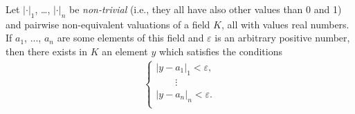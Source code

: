 \documentclass[12pt]{article}
\begin{document}
Let $|\cdot|_1$, \ldots, $|\cdot|_n$ be {\em non-trivial} (i.e., they all have also other values than 0 and 1) and pairwise non-equivalent valuations of a field $K$, all with values real numbers. \,If $a_1$, ..., $a_n$ are some elements of this field and $\varepsilon$ is an arbitrary positive number, then there exists in $K$ an element $y$ which satisfies the conditions
\begin{align*}
\begin{cases}
                |y-a_1|_1 < \varepsilon,\\
                \qquad     \vdots \qquad \\  
                |y-a_n|_n < \varepsilon.\\
\end{cases}
\end{align*}
\end{document}
